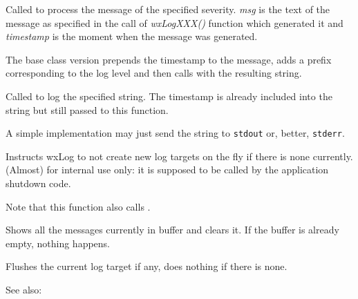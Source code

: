 \label{wxlogdolog}


Called to process the message of the specified severity. {\it msg} is the text
of the message as specified in the call of {\it wxLogXXX()} function which
generated it and {\it timestamp} is the moment when the message was generated.

The base class version prepends the timestamp to the message, adds a prefix
corresponding to the log level and then calls
 with the resulting string.

\label{wxlogdologstring}


Called to log the specified string. The timestamp is already included into the
string but still passed to this function.

A simple implementation may just send the string to {\tt stdout} or, better,
{\tt stderr}.

\label{wxlogdontcreateondemand}


Instructs wxLog to not create new log targets on the fly if there is none
currently. (Almost) for internal use only: it is supposed to be called by the
application shutdown code.

Note that this function also calls
.

\label{wxlogflush}


Shows all the messages currently in buffer and clears it. If the buffer
is already empty, nothing happens.

\label{wxlogflushactive}


Flushes the current log target if any, does nothing if there is none.

See also:


\label{wxloghaspendingmessages}

